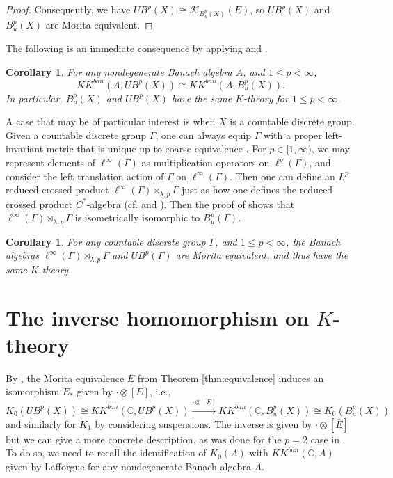\documentclass[a4,11pt]{amsart}
\newtheorem{cor}[thm]{Corollary}
\theoremstyle{remark}
\begin{document}
\begin{proof}
Consequently, we have $UB^p(X)\cong \mathcal{K}_{B^p_u(X)}(E)$, so $UB^p(X)$ and $B^p_u(X)$ are Morita equivalent.
\end{proof}

The following is an immediate consequence by applying \cite[Theorem 5.29]{Par09} and \cite[Th\'{e}or\`{e}me 1.2.8]{Laf02}.

\begin{cor} \label{cor:K}
For any nondegenerate Banach algebra $A$, and $1\leq p<\infty$, \[ KK^{ban}(A,UB^p(X))\cong KK^{ban}(A,B^p_u(X)). \]
In particular, $B^p_u(X)$ and $UB^p(X)$ have the same $K$-theory for $1\leq p<\infty$. 
\end{cor}

A case that may be of particular interest is when $X$ is a countable discrete group.
Given a countable discrete group $\Gamma$, one can always equip $\Gamma$ with a proper left-invariant metric that is unique up to coarse equivalence \cite[Lemma 2.1]{Tu01}.
For $p\in[1,\infty)$, we may represent elements of $\ell^\infty(\Gamma)$ as multiplication operators on $\ell^p(\Gamma)$, and consider the left translation action of $\Gamma$ on $\ell^\infty(\Gamma)$. Then one can define an $L^p$ reduced crossed product $\ell^\infty(\Gamma)\rtimes_{\lambda,p}\Gamma$ just as how one defines the reduced crossed product $C^\ast$-algebra (cf. \cite[Definition 4.1.4]{BO} and \cite[Remark 2.7]{Chung21}). Then the proof of \cite[Proposition 5.1.3]{BO} shows that $\ell^\infty(\Gamma)\rtimes_{\lambda,p}\Gamma$ is isometrically isomorphic to $B^p_u(\Gamma)$.

\begin{cor} \label{cor:group}
For any countable discrete group $\Gamma$, and $1\leq p<\infty$, the Banach algebras $\ell^\infty(\Gamma)\rtimes_{\lambda,p}\Gamma$ and $UB^p(\Gamma)$ are Morita equivalent, and thus have the same $K$-theory.
\end{cor}


\section{The inverse homomorphism on $K$-theory} \label{sect:inv}

By \cite[Theorem 5.29]{Par09}, the Morita equivalence $E$ from Theorem \ref{thm:equivalence} induces an isomorphism $E_*$ given by $\cdot\otimes[E]$, i.e.,
\[ K_0(UB^p(X))\cong KK^{ban}(\mathbb{C},UB^p(X)) \stackrel{\cdot\otimes[E]}{\rightarrow} KK^{ban}(\mathbb{C},B^p_u(X))\cong K_0(B^p_u(X)) \]
and similarly for $K_1$ by considering suspensions. 
The inverse is given by $\cdot\otimes[\bar{E}]$ but we can give a more concrete description, as was done for the $p=2$ case in \cite[Proposition 4.8]{SW13}.
To do so, we need to recall the identification of $K_0(A)$ with $KK^{ban}(\mathbb{C},A)$ given by Lafforgue \cite[Th\'{e}or\`{e}me 1.2.8]{Laf02} for any nondegenerate Banach algebra $A$.
\end{document}
